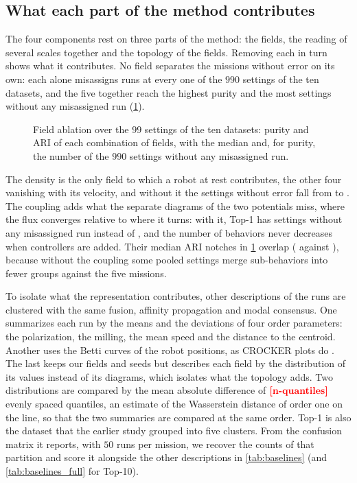 \documentclass[pdflatex,sn-apa]{sn-jnl}
\begin{document}
\FloatBarrier
\subsection{What each part of the method contributes}
\label{sec:res_why}\label{sec:res_compare}\label{sec:res_robust}

The four components rest on three parts of the method: the fields, the reading of several scales together and the
topology of the fields. Removing each in turn shows what it contributes. No field separates the missions without error
on its own: each alone misassigns runs at every one of the $990$ settings of the ten datasets, and the five together
reach the highest purity and the most settings without any misassigned run (\cref{fig:ablation}).

\begin{figure}[!htb]
\centering
{}
\caption{Field ablation over the $99$ settings of the ten datasets: purity and ARI of each combination of fields, with
the median and, for purity, the number of the $990$ settings without any misassigned run.}
\label{fig:ablation}
\end{figure}

The density is the only field to which a robot at rest contributes, the other four vanishing with its velocity, and
without it the settings without error fall from  to . The coupling adds
what the separate diagrams of the two potentials miss, where the flux converges relative to where it turns: with it,
Top-1 has  settings without any misassigned run instead of , and the
number of behaviors never decreases when controllers are added. Their median ARI notches in \cref{fig:ablation} overlap
( against ), because without the coupling some pooled settings merge
sub-behaviors into fewer groups against the five missions.

To isolate what the representation contributes, other descriptions of the runs are clustered with the same fusion,
affinity propagation and modal consensus. One summarizes each run by the means and the deviations of four order
parameters: the polarization, the milling, the mean speed and the distance to the centroid. Another uses
the Betti curves of the robot positions, as CROCKER plots do \citep{topaz2015topological,bhaskar2019analyzing}. The
last keeps our fields and seeds but describes each field by the distribution of its values instead of its diagrams,
which isolates what the topology adds. Two distributions are compared by the mean absolute difference of
$\nm{n-quantiles}$ evenly spaced quantiles, an estimate of the Wasserstein distance of order one on the line, so that
the two summaries are compared at the same order. Top-1 is also the dataset that the earlier study grouped into five
clusters. From the confusion matrix it reports, with $50$ runs per mission, we recover the counts of that partition and
score it alongside the other descriptions in \cref{tab:baselines} (and \cref{tab:baselines_full} for Top-10).
\end{document}
